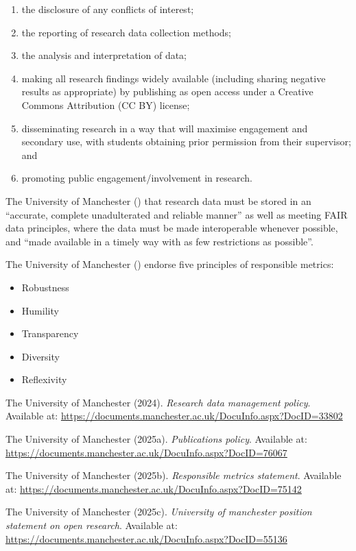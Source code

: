 \documentclass[
  british,
]{article}
\newlength{\cslhangindent}
\newenvironment{CSLReferences}[2] %
 {\begin{list}{}{%
  \setlength{\itemindent}{0pt}
  \setlength{\leftmargin}{0pt}
  \setlength{\parsep}{0pt}
  \ifodd #1
   \setlength{\leftmargin}{\cslhangindent}
   \setlength{\itemindent}{-1\cslhangindent}
  \fi
  \setlength{\itemsep}{#2\baselineskip}}}
 {\end{list}}
\providecommand{\tightlist}{%
  \setlength{\itemsep}{0pt}\setlength{\parskip}{0pt}}
\begin{document}
\begin{enumerate}
\def\labelenumi{\arabic{enumi}.}
\tightlist
\item
  the disclosure of any conflicts of interest;
\item
  the reporting of research data collection methods;
\item
  the analysis and interpretation of data;
\item
  making all research findings widely available (including sharing
  negative results as appropriate) by publishing as open access under a
  Creative Commons Attribution (CC BY) license;
\item
  disseminating research in a way that will maximise engagement and
  secondary use, with students obtaining prior permission from their
  supervisor; and
\item
  promoting public engagement/involvement in research.
\end{enumerate}

The University of Manchester
() that research data must
be stored in an ``accurate, complete unadulterated and reliable manner''
as well as meeting FAIR data principles, where the data must be made
interoperable whenever possible, and ``made available in a timely way
with as few restrictions as possible''.

The University of Manchester ()
endorse five principles of responsible metrics:

\begin{itemize}
\tightlist
\item
  Robustness
\item
  Humility
\item
  Transparency
\item
  Diversity
\item
  Reflexivity
\end{itemize}

\protect{}\label{refs}
\begin{CSLReferences}{1}{0}
The University of Manchester (2024). \emph{Research data management
policy}. Available at:
\url{https://documents.manchester.ac.uk/DocuInfo.aspx?DocID=33802}

The University of Manchester (2025a). \emph{Publications policy}.
Available at:
\url{https://documents.manchester.ac.uk/DocuInfo.aspx?DocID=76067}

The University of Manchester (2025b). \emph{Responsible metrics
statement}. Available at:
\url{https://documents.manchester.ac.uk/DocuInfo.aspx?DocID=75142}

The University of Manchester (2025c). \emph{University of manchester
position statement on open research}. Available at:
\url{https://documents.manchester.ac.uk/DocuInfo.aspx?DocID=55136}

\end{CSLReferences}
\end{document}
